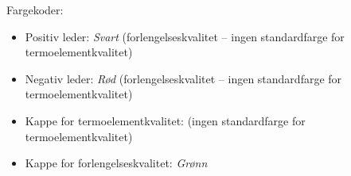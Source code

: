 Fargekoder:

\begin{itemize}
\item{} Positiv leder: {\it Svart} (forlengelseskvalitet -- ingen standardfarge for termoelementkvalitet)
\item{} Negativ leder: {\it Rød} (forlengelseskvalitet -- ingen standardfarge for termoelementkvalitet)
\item{} Kappe for termoelementkvalitet: (ingen standardfarge for termoelementkvalitet)
\item{} Kappe for forlengelseskvalitet: {\it Grønn}
\end{itemize}










